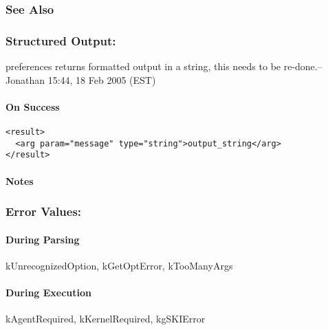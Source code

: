 \subsubsection*{See Also}
\subsubsection*{Structured Output:}
 preferences returns formatted output in a string, this needs to be re-done.--Jonathan 15:44, 18 Feb 2005 (EST) 
\paragraph*{On Success}
\begin{verbatim}
<result>
  <arg param="message" type="string">output_string</arg>
</result>
\end{verbatim}
\paragraph*{Notes}
\subsubsection*{Error Values:}
\paragraph*{During Parsing}
 kUnrecognizedOption, kGetOptError, kTooManyArgs
\paragraph*{During Execution}
 kAgentRequired, kKernelRequired, kgSKIError
